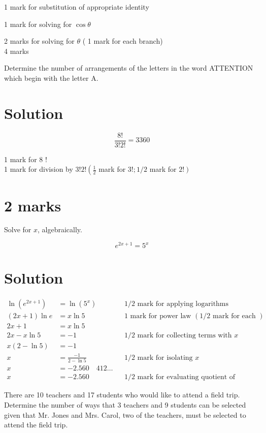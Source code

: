 \documentclass[10pt]{article}
\begin{document}
1 mark for substitution of appropriate identity

1 mark for solving for $\cos \theta$

2 marks for solving for $\theta$ ( 1 mark for each branch)\\
4 marks

Determine the number of arrangements of the letters in the word ATTENTION which begin with the letter A.

\section*{Solution}
$$
\frac{8!}{3!2!}=3360
$$

1 mark for 8 !\\
1 mark for division by $3!2!\left(\frac{1}{2}\right.$ mark for $3!; 1 / 2$ mark for $\left.2!\right)$

\section*{2 marks}
Solve for $x$, algebraically.

$$
e^{2 x+1}=5^{x}
$$

\section*{Solution}
$$
\begin{aligned}
\ln \left(e^{2 x+1}\right) & =\ln \left(5^{x}\right) & & 1 / 2 \text { mark for applying logarithms } \\
(2 x+1) \ln e & =x \ln 5 & & 1 \text { mark for power law }(1 / 2 \text { mark for each }) \\
2 x+1 & =x \ln 5 & & \\
2 x-x \ln 5 & =-1 & & 1 / 2 \text { mark for collecting terms with } x \\
x(2-\ln 5) & =-1 & & \\
x & =\frac{-1}{2-\ln 5} & & 1 / 2 \text { mark for isolating } x \\
x & =-2.560 \quad 412 \ldots & & \\
x & =-2.560 & & 1 / 2 \text { mark for evaluating quotient of logarithms }
\end{aligned}
$$

There are 10 teachers and 17 students who would like to attend a field trip.\\
Determine the number of ways that 3 teachers and 9 students can be selected given that Mr. Jones and Mrs. Carol, two of the teachers, must be selected to attend the field trip.
\end{document}
